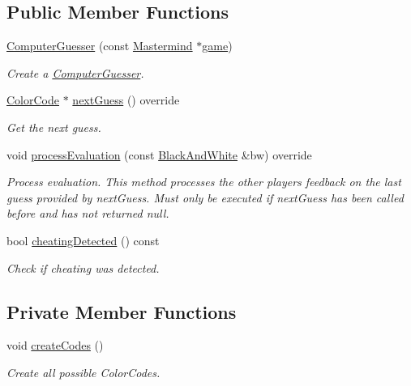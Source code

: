\subsection*{Public Member Functions}
\begin{DoxyCompactItemize}
\item 
\hyperlink{classmastermind_1_1logic_1_1_computer_guesser_a685a4f74519d1dbfb3e6e429bb6d6a60}{Computer\+Guesser} (const \hyperlink{classmastermind_1_1logic_1_1_mastermind}{Mastermind} $\ast$\hyperlink{classmastermind_1_1logic_1_1_computer_guesser_a2f061369ee7e4e0319093a182fc41065}{game})
\begin{DoxyCompactList}\small\item\em Create a \hyperlink{classmastermind_1_1logic_1_1_computer_guesser}{Computer\+Guesser}. \end{DoxyCompactList}\item 
\hyperlink{classmastermind_1_1logic_1_1_color_code}{Color\+Code} $\ast$ \hyperlink{classmastermind_1_1logic_1_1_computer_guesser_a5553cb2d63534927fbf9031c5d40c828}{next\+Guess} () override
\begin{DoxyCompactList}\small\item\em Get the next guess. \end{DoxyCompactList}\item 
void \hyperlink{classmastermind_1_1logic_1_1_computer_guesser_a728f55a5700d3574fc6b9207c9e8db7d}{process\+Evaluation} (const \hyperlink{classmastermind_1_1logic_1_1_black_and_white}{Black\+And\+White} \&bw) override
\begin{DoxyCompactList}\small\item\em Process evaluation. This method processes the other player\textquotesingle{}s feedback on the last guess provided by {\ttfamily next\+Guess}. Must only be executed if {\ttfamily next\+Guess} has been called before and has not returned {\ttfamily null}. \end{DoxyCompactList}\item 
bool \hyperlink{classmastermind_1_1logic_1_1_computer_guesser_ae93df46297030bcbd924f5ddc4af4889}{cheating\+Detected} () const
\begin{DoxyCompactList}\small\item\em Check if cheating was detected. \end{DoxyCompactList}\end{DoxyCompactItemize}
\subsection*{Private Member Functions}
\begin{DoxyCompactItemize}
\item 
void \hyperlink{classmastermind_1_1logic_1_1_computer_guesser_aa7c627d1d8ac073cc40e5693064e58c9}{create\+Codes} ()
\begin{DoxyCompactList}\small\item\em Create all possible Color\+Codes. \end{DoxyCompactList}\end{DoxyCompactItemize}
